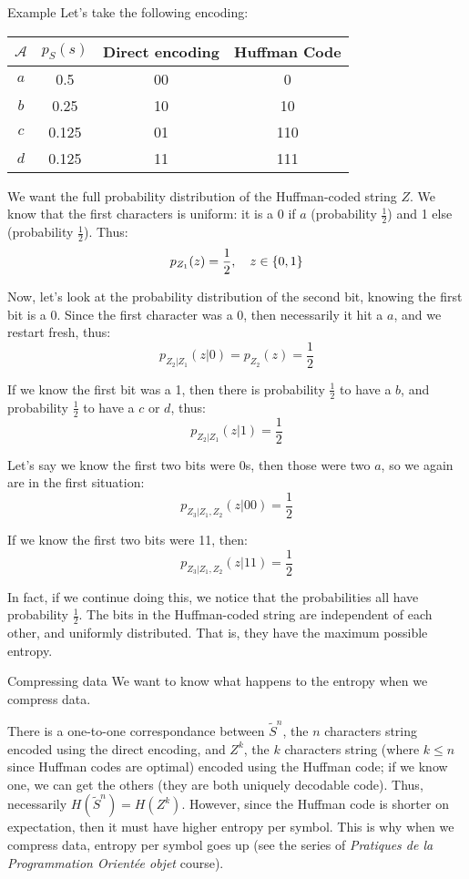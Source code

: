 \documentclass[a4paper]{article}
\begin{document}
\begin{parag}{Example}
    Let's take the following encoding:
    \begin{center}
    \begin{tabular}{c|c|cc}
        $\mathcal{A}$ & $p_S\left(s\right)$ & Direct encoding & Huffman Code \\
        \hline
        $a$ & 0.5 & 00 & 0 \\
        $b$ & 0.25 & 10 & 10 \\
        $c$ & 0.125 & 01 & 110 \\
        $d$ & 0.125 & 11 & 111
    \end{tabular}
    \end{center}

    We want the full probability distribution of the Huffman-coded string $Z$. We know that the first characters is uniform: it is a 0 if $a$ (probability $\frac{1}{2}$) and 1 else (probability $\frac{1}{2}$). Thus:
    \[p_{Z_1}\left(z\right) = \frac{1}{2}, \mathspace z \in \left\{0, 1\right\}\]

    Now, let's look at the probability distribution of the second bit, knowing the first bit is a 0. Since the first character was a 0, then necessarily it hit a $a$, and we restart fresh, thus:
    \[p_{Z_2|Z_1}\left(z|0\right) = p_{Z_2}\left(z\right) = \frac{1}{2}\]

    If we know the first bit was a 1, then there is probability $\frac{1}{2}$ to have a $b$, and probability $\frac{1}{2}$ to have a $c$ or $d$, thus:
    \[p_{Z_2 |Z_1}\left(z | 1\right) = \frac{1}{2}\]

    Let's say we know the first two bits were 0s, then those were two $a$, so we again are in the first situation:
    \[p_{Z_3|Z_1, Z_2}\left(z |00\right) = \frac{1}{2}\]

    If we know the first two bits were 11, then:
    \[p_{Z_3|Z_1, Z_2}\left(z | 11\right) = \frac{1}{2}\]

    In fact, if we continue doing this, we notice that the probabilities all have  probability $\frac{1}{2}$. The bits in the Huffman-coded string are independent of each other, and uniformly distributed. That is, they have the maximum possible entropy.
\end{parag}

\begin{parag}{Compressing data}
    We want to know what happens to the entropy when we compress data.

   There is a one-to-one correspondance between $\widetilde{S}^n$, the $n$ characters string encoded using the direct encoding, and $Z^k$, the $k$ characters string (where $k \leq n$ since Huffman codes are optimal) encoded using the Huffman code; if we know one, we can get the others (they are both uniquely decodable code). Thus, necessarily $H\left(\widetilde{S}^n\right) = H\left(Z^k\right)$. However, since the Huffman code is shorter on expectation, then it must have higher entropy per symbol. This is why when we compress data, entropy per symbol goes up (see the  series of \textit{Pratiques de la Programmation Orientée objet} course).
\end{parag}
\end{document}
